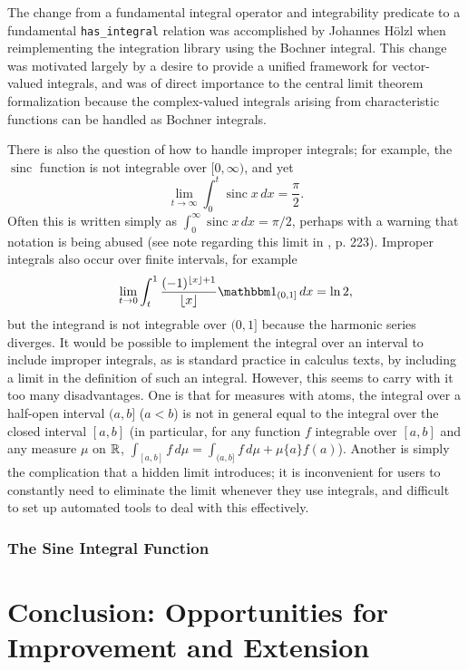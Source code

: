 \documentclass{article}
\theoremstyle{definition}
\newcommand\sinc{\mathop{\text{sinc}}\nolimits}
\newcommand\floor[1]{\lfloor {#1} \rfloor}
\begin{document}
The change from a fundamental integral operator and integrability predicate to a fundamental \texttt{has\_integral} relation was accomplished by Johannes H\"olzl when reimplementing the integration library using the Bochner integral. This change was motivated largely by a desire to provide a unified framework for vector-valued integrals, and was of direct importance to the central limit theorem formalization because the complex-valued integrals arising from characteristic functions can be handled as Bochner integrals.

There is also the question of how to handle improper integrals; for example, the $\sinc$ function is not integrable over $[0,\infty)$, and yet 
\[ \lim_{t \rightarrow \infty} \int_0^t \sinc x \, dx = \frac{\pi}{2}. \]
Often this is written simply as $\int_0^\infty \sinc x \, dx = \pi/2$, perhaps with a warning that notation is being abused (see note regarding this limit in \cite{billingsley}, p. 223). Improper integrals also occur over finite intervals, for example
\[ \lim_{t \rightarrow 0} \int_t^1 \frac{(-1)^{\floor x + 1}}{\floor x} \mathbbm 1_{(0,1]} \, dx = \ln 2, \]
but the integrand is not integrable over $(0,1]$ because the harmonic series diverges. It would be possible to implement the integral over an interval to include improper integrals, as is standard practice in calculus texts, by including a limit in the definition of such an integral. However, this seems to carry with it too many disadvantages. One is that for measures with atoms, the integral over a half-open interval $(a,b]$ ($a < b$) is not in general equal to the integral over the closed interval $[a,b]$ (in particular, for any function $f$ integrable over $[a,b]$ and any measure $\mu$ on $\mathbb{R}$, $\int_{[a,b]} f \, d\mu = \int_{(a,b]} f \, d\mu + \mu \{a\} f(a)$). Another is simply the complication that a hidden limit introduces; it is inconvenient for users to constantly need to eliminate the limit whenever they use integrals, and difficult to set up automated tools to deal with this effectively.

\subsubsection{The Sine Integral Function}

\section{Conclusion: Opportunities for Improvement and Extension}



\end{document}
